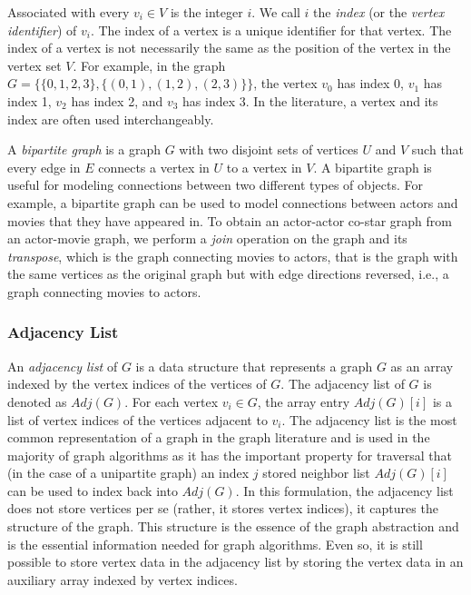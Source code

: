 
Associated with every $v_i \in V$ is the integer $i$.  We call $i$ the \emph{index}
(or the \emph{vertex identifier}) of $v_i$.  The index of a vertex is a unique
identifier for that vertex.  The index of a vertex is not necessarily the same
as the position of the vertex in the vertex set $V$.  For example, in the graph
$G = \{ \{ 0, 1, 2, 3 \}, \{ (0, 1), (1, 2), (2, 3) \} \}$, the vertex $v_0$ has index 0,
$v_1$ has index 1, $v_2$ has index 2, and $v_3$ has index 3.  In the literature,
a vertex and its index are often used interchangeably.

A \emph{bipartite graph} is a graph $G$ with two disjoint sets of
vertices $U$ and $V$ such that every edge in $E$ connects a vertex
in $U$ to a vertex in $V$.  A bipartite graph is useful for modeling
connections between two different types of objects.  For example,
a bipartite graph can be used to model connections between
actors and movies that they have appeared in.  To obtain
an actor-actor co-star graph from an actor-movie graph, we
perform a \emph{join} operation on the graph and its \emph{transpose}, which is
the graph connecting movies to actors, that is the graph with the same
vertices as the original graph but with edge directions reversed, i.e., a graph
connecting movies to actors.

\subsubsection{Adjacency List}

An \emph{adjacency list} of $G$ is a data structure that represents a graph $G$ as an array
indexed by the vertex indices of the vertices of $G$.
The adjacency list of $G$ is denoted as $Adj(G)$.
For each vertex $v_i \in G$, the array entry $Adj(G)[i]$ is a list of
vertex indices of the vertices adjacent to $v_i$.
The adjacency list is the most common representation of a graph in the graph literature
and is used in the majority of graph algorithms as it has the important
property for traversal that (in the case of a unipartite graph)
an index $j$ stored neighbor list $Adj(G)[i]$ can
be used to index back into $Adj(G)$.  In this formulation, the adjacency list
does not store vertices per se (rather, it stores vertex indices), it captures the
structure of the graph.  This structure is the essence of the graph abstraction and
is the essential information needed for graph algorithms.
Even so, it is still possible to store vertex data in the adjacency list by storing
the vertex data in an auxiliary array indexed by vertex indices.


